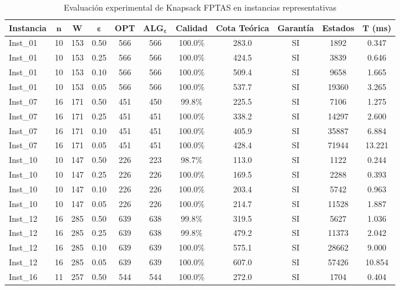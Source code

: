 \begin{table}[H]
    \caption{Evaluación experimental de Knapsack FPTAS en instancias representativas}
    \label{tab:resumen_knap}
    \centering
    \scriptsize
    \begin{tabular*}{\textwidth}{@{\extracolsep{\fill}}lcccccccccc}
        \toprule
        \textbf{Instancia} & $\mathbf{n}$ & $\mathbf{W}$ & $\mathbf{\varepsilon}$ & \textbf{OPT} & $\mathbf{ALG_\varepsilon}$ & \textbf{Calidad} & \textbf{Cota Teórica} & \textbf{Garantía} & \textbf{Estados} & $\mathbf{T}$ (ms) \\
        \midrule
Inst\_01 & 10 & 153 & 0.50 & 566 & 566 & 100.0\% & 283.0 & SI & 1892 & 0.347 \\
Inst\_01 & 10 & 153 & 0.25 & 566 & 566 & 100.0\% & 424.5 & SI & 3839 & 0.646 \\
Inst\_01 & 10 & 153 & 0.10 & 566 & 566 & 100.0\% & 509.4 & SI & 9658 & 1.665 \\
Inst\_01 & 10 & 153 & 0.05 & 566 & 566 & 100.0\% & 537.7 & SI & 19360 & 3.265 \\
Inst\_07 & 16 & 171 & 0.50 & 451 & 450 & 99.8\% & 225.5 & SI & 7106 & 1.275 \\
Inst\_07 & 16 & 171 & 0.25 & 451 & 451 & 100.0\% & 338.2 & SI & 14297 & 2.600 \\
Inst\_07 & 16 & 171 & 0.10 & 451 & 451 & 100.0\% & 405.9 & SI & 35887 & 6.884 \\
Inst\_07 & 16 & 171 & 0.05 & 451 & 451 & 100.0\% & 428.4 & SI & 71944 & 13.221 \\
Inst\_10 & 10 & 147 & 0.50 & 226 & 223 & 98.7\% & 113.0 & SI & 1122 & 0.244 \\
Inst\_10 & 10 & 147 & 0.25 & 226 & 226 & 100.0\% & 169.5 & SI & 2288 & 0.393 \\
Inst\_10 & 10 & 147 & 0.10 & 226 & 226 & 100.0\% & 203.4 & SI & 5742 & 0.963 \\
Inst\_10 & 10 & 147 & 0.05 & 226 & 226 & 100.0\% & 214.7 & SI & 11528 & 1.887 \\
Inst\_12 & 16 & 285 & 0.50 & 639 & 638 & 99.8\% & 319.5 & SI & 5627 & 1.036 \\
Inst\_12 & 16 & 285 & 0.25 & 639 & 638 & 99.8\% & 479.2 & SI & 11373 & 2.042 \\
Inst\_12 & 16 & 285 & 0.10 & 639 & 639 & 100.0\% & 575.1 & SI & 28662 & 9.000 \\
Inst\_12 & 16 & 285 & 0.05 & 639 & 639 & 100.0\% & 607.0 & SI & 57426 & 10.854 \\
Inst\_16 & 11 & 257 & 0.50 & 544 & 544 & 100.0\% & 272.0 & SI & 1704 & 0.404 \\

\end{tabular*}
\end{table}
